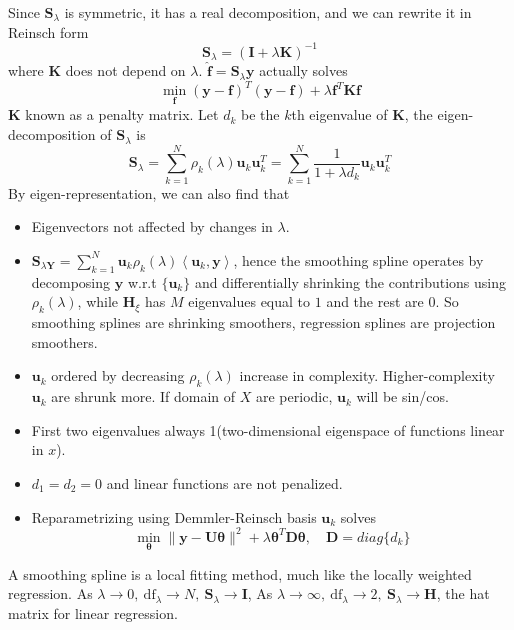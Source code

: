 Since $\mathbf{S}_{\lambda}$ is symmetric, it has a real decomposition, and we can rewrite
it in Reinsch form
\begin{equation*}
    \mathbf{S}_{\lambda}=(\mathbf{I}+\lambda \mathbf{K})^{-1}
\end{equation*}
where $\mathbf{K}$ does not depend on $\lambda$. 
$\hat{\mathbf{f}}=\mathbf{S}_{\lambda} \mathbf{y}$ actually solves
\begin{equation*}
    \min _{\mathbf{f}}(\mathbf{y}-\mathbf{f})^{T}(\mathbf{y}-\mathbf{f})
    +\lambda \mathbf{f}^{T} \mathbf{K} \mathbf{f}
\end{equation*}
$\mathbf{K}$ known as a penalty matrix. Let $d_k$ be the $k$th eigenvalue of $\mathbf{K}$, 
the eigen-decomposition of $\mathbf{S}_{\lambda}$ is
\begin{equation*}
    \mathbf{S}_{\lambda}=\sum_{k=1}^{N} \rho_{k}(\lambda) \mathbf{u}_{k} \mathbf{u}_{k}^{T}
    =\sum_{k=1}^{N} \frac{1}{1+\lambda d_{k}} \mathbf{u}_{k} \mathbf{u}_{k}^{T}
\end{equation*}
By eigen-representation, we can also find that
\begin{itemize}
\item Eigenvectors not affected by changes in $\lambda$. 
\item $\mathbf{S}_{\lambda \mathbf{Y}}=\sum_{k=1}^{N} \mathbf{u}_{k} 
\rho_{k}(\lambda)\left\langle\mathbf{u}_{k}, \mathbf{y}\right\rangle$, hence the smoothing
spline operates by decomposing $\mathbf{y}$ w.r.t $\{\mathbf{u}_k\}$ and differentially 
shrinking the contributions using $\rho_k(\lambda)$, while $\mathbf{H}_{\xi}$ has $M$ 
eigenvalues equal to $1$ and the rest are $0$. So smoothing splines are shrinking smoothers, 
regression splines are projection smoothers. 
\item $\mathbf{u}_k$ ordered by decreasing $\rho_k(\lambda)$ increase in complexity. Higher-complexity
$\mathbf{u}_k$ are shrunk more. If domain of $X$ are periodic, $\mathbf{u}_k$ will be sin/cos. 
\item First two eigenvalues always 1(two-dimensional eigenspace of functions linear in $x$). 
\item $d_1=d_2=0$ and linear functions are not penalized. 
\item Reparametrizing using Demmler-Reinsch basis $\mathbf{u}_k$ solves
\begin{equation*}
    \min _{\boldsymbol{\theta}}\|\mathbf{y}-\mathbf{U} \boldsymbol{\theta}\|^{2}+\lambda 
    \boldsymbol{\theta}^{T} \mathbf{D} \boldsymbol{\theta},\quad \mathbf{D}=diag\{d_k\}
\end{equation*}
\end{itemize}
A smoothing spline is a local fitting method, much like the locally weighted regression. 
As $\lambda\rightarrow 0,~\mathrm{df}_{\lambda} \rightarrow N,~
\mathbf{S}_{\lambda} \rightarrow \mathbf{I}$, As 
$\lambda\rightarrow \infty,~\mathrm{df}_{\lambda} \rightarrow 2,~
\mathbf{S}_{\lambda} \rightarrow \mathbf{H}$, the hat matrix for linear regression. 

